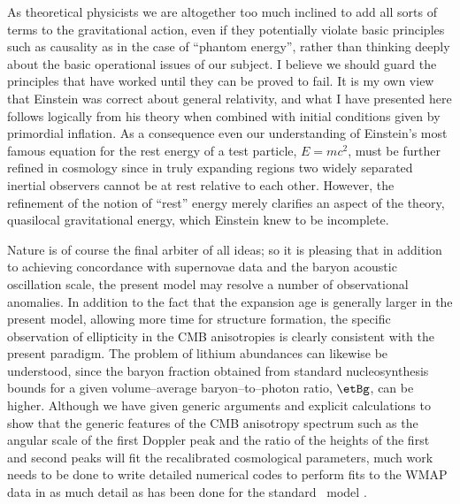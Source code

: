 \documentclass[12pt]{iopart}
\begin{document}
As theoretical physicists we are altogether too much inclined to
add all sorts of terms to the gravitational action, even if they potentially
violate basic principles such as causality as in the case of ``phantom
energy'', rather than thinking deeply about the basic operational issues of
our subject. I believe we should guard the principles that have worked until
they can be proved to fail. It is my own view that Einstein
was correct about general relativity, and what I have presented here
follows logically from his theory when combined with initial conditions
given by primordial inflation. As a consequence even our understanding of
Einstein's most famous equation for the rest energy of a test particle,
$E=mc^2$, must be further refined in cosmology since in truly expanding regions
two widely separated inertial observers cannot be at rest relative to each
other. However, the refinement of the notion of ``rest'' energy merely
clarifies an aspect of the theory, quasilocal gravitational energy, which
Einstein knew to be incomplete.

Nature is of course the final arbiter of all ideas; so it is pleasing
that in addition to achieving concordance with supernovae data and the baryon
acoustic oscillation scale, the present model may resolve a number of
observational anomalies.
In addition to the fact that the expansion age is generally larger in the
present model, allowing more time for structure formation, the specific
observation of ellipticity in the CMB anisotropies \cite{elliptic2,elliptic1}
is clearly consistent with the present paradigm. The problem of lithium
abundances \cite{lithium} can likewise be understood, since the baryon
fraction obtained from standard nucleosynthesis bounds for a given
volume--average baryon--to--photon ratio, $\etBg$, can be higher.
Although we have given generic arguments and explicit calculations to show
that the generic features of the CMB anisotropy spectrum such as the angular
scale of the first Doppler peak and the ratio of the heights of the first
and second peaks will fit the recalibrated cosmological parameters, much
work needs to be done to write detailed numerical codes to perform
fits to the WMAP data in as much detail as has been done for the standard
\LCDM\ model \cite{wmap}.
\end{document}
